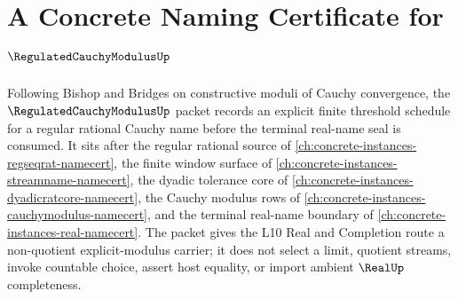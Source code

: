 \chapter{A Concrete Naming Certificate for $\RegulatedCauchyModulusUp$}
\label{ch:concrete-instances-regulated-cauchy-modulus-namecert}

Following Bishop and Bridges on constructive moduli of Cauchy convergence, the $\RegulatedCauchyModulusUp$ packet records an explicit finite threshold schedule for a regular rational Cauchy name before the terminal real-name seal is consumed. It sits after the regular rational source of \autoref{ch:concrete-instances-regseqrat-namecert}, the finite window surface of \autoref{ch:concrete-instances-streamname-namecert}, the dyadic tolerance core of \autoref{ch:concrete-instances-dyadicratcore-namecert}, the Cauchy modulus rows of \autoref{ch:concrete-instances-cauchymodulus-namecert}, and the terminal real-name boundary of \autoref{ch:concrete-instances-real-namecert}. The packet gives the L10 Real and Completion route a non-quotient explicit-modulus carrier; it does not select a limit, quotient streams, invoke countable choice, assert host equality, or import ambient $\RealUp$ completeness.

